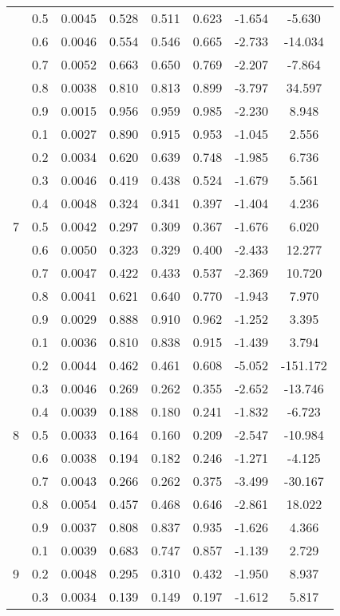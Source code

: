 \documentclass[11pt,a4paper]{report}
\begin{document}
\begin{longtable}{ | c | c || c | c | c | c | c | c | }
 & 0.5 & 0.0045 & 0.528 & 0.511 & 0.623 & -1.654 & -5.630 \\
 & 0.6 & 0.0046 & 0.554 & 0.546 & 0.665 & -2.733 & -14.034 \\
 & 0.7 & 0.0052 & 0.663 & 0.650 & 0.769 & -2.207 & -7.864 \\
 & 0.8 & 0.0038 & 0.810 & 0.813 & 0.899 & -3.797 & 34.597 \\
 & 0.9 & 0.0015 & 0.956 & 0.959 & 0.985 & -2.230 & 8.948 \\
 \hline
\multirow{9}{*}{7} & 0.1 & 0.0027 & 0.890 & 0.915 & 0.953 & -1.045 & 2.556 \\
 & 0.2 & 0.0034 & 0.620 & 0.639 & 0.748 & -1.985 & 6.736 \\
 & 0.3 & 0.0046 & 0.419 & 0.438 & 0.524 & -1.679 & 5.561 \\
 & 0.4 & 0.0048 & 0.324 & 0.341 & 0.397 & -1.404 & 4.236 \\
 & 0.5 & 0.0042 & 0.297 & 0.309 & 0.367 & -1.676 & 6.020 \\
 & 0.6 & 0.0050 & 0.323 & 0.329 & 0.400 & -2.433 & 12.277 \\
 & 0.7 & 0.0047 & 0.422 & 0.433 & 0.537 & -2.369 & 10.720 \\
 & 0.8 & 0.0041 & 0.621 & 0.640 & 0.770 & -1.943 & 7.970 \\
 & 0.9 & 0.0029 & 0.888 & 0.910 & 0.962 & -1.252 & 3.395 \\
 \hline
\multirow{9}{*}{8} & 0.1 & 0.0036 & 0.810 & 0.838 & 0.915 & -1.439 & 3.794 \\
 & 0.2 & 0.0044 & 0.462 & 0.461 & 0.608 & -5.052 & -151.172 \\
 & 0.3 & 0.0046 & 0.269 & 0.262 & 0.355 & -2.652 & -13.746 \\
 & 0.4 & 0.0039 & 0.188 & 0.180 & 0.241 & -1.832 & -6.723 \\
 & 0.5 & 0.0033 & 0.164 & 0.160 & 0.209 & -2.547 & -10.984 \\
 & 0.6 & 0.0038 & 0.194 & 0.182 & 0.246 & -1.271 & -4.125 \\
 & 0.7 & 0.0043 & 0.266 & 0.262 & 0.375 & -3.499 & -30.167 \\
 & 0.8 & 0.0054 & 0.457 & 0.468 & 0.646 & -2.861 & 18.022 \\
 & 0.9 & 0.0037 & 0.808 & 0.837 & 0.935 & -1.626 & 4.366 \\
 \hline
\multirow{9}{*}{9} & 0.1 & 0.0039 & 0.683 & 0.747 & 0.857 & -1.139 & 2.729 \\
 & 0.2 & 0.0048 & 0.295 & 0.310 & 0.432 & -1.950 & 8.937 \\
 & 0.3 & 0.0034 & 0.139 & 0.149 & 0.197 & -1.612 & 5.817 \\

\end{longtable}
\end{document}
